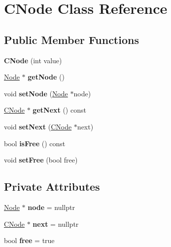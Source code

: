 \hypertarget{class_c_node}{}\section{C\+Node Class Reference}
\label{class_c_node}
\subsection*{Public Member Functions}
\begin{DoxyCompactItemize}
\item 
\mbox{\label{class_c_node_a5d2f36a2357458bdc2c6824c96b9cbf4}} 
{\bfseries C\+Node} (int value)
\item 
\mbox{\label{class_c_node_a33028b0491c365d37a33bab6eaf6cee2}} 
\mbox{\hyperlink{class_node}{Node}} $\ast$ {\bfseries get\+Node} ()
\item 
\mbox{\label{class_c_node_ab351d4f06d1f57cfebcecd8ce18dfad4}} 
void {\bfseries set\+Node} (\mbox{\hyperlink{class_node}{Node}} $\ast$node)
\item 
\mbox{\label{class_c_node_afc8f1c6c08255f7c0d149503cfa5f03c}} 
\mbox{\hyperlink{class_c_node}{C\+Node}} $\ast$ {\bfseries get\+Next} () const
\item 
\mbox{\label{class_c_node_a2d39889485faeedba56a568a1fd33b17}} 
void {\bfseries set\+Next} (\mbox{\hyperlink{class_c_node}{C\+Node}} $\ast$next)
\item 
\mbox{\label{class_c_node_aa79a5fcea7008ffbfd931afafee8660e}} 
bool {\bfseries is\+Free} () const
\item 
\mbox{\label{class_c_node_abccd0989691a4cd1a86bcec8871c2517}} 
void {\bfseries set\+Free} (bool free)
\end{DoxyCompactItemize}
\subsection*{Private Attributes}
\begin{DoxyCompactItemize}
\item 
\mbox{\label{class_c_node_a1a8326d08635d5546920007ec5193b63}} 
\mbox{\hyperlink{class_node}{Node}} $\ast$ {\bfseries node} = nullptr
\item 
\mbox{\label{class_c_node_ae52ba5491d85da9a4db6d99f0c88d7cc}} 
\mbox{\hyperlink{class_c_node}{C\+Node}} $\ast$ {\bfseries next} = nullptr
\item 
\mbox{\label{class_c_node_a1ed83f80bdf874731cdb06bddaa80114}} 
bool {\bfseries free} = true
\end{DoxyCompactItemize}


